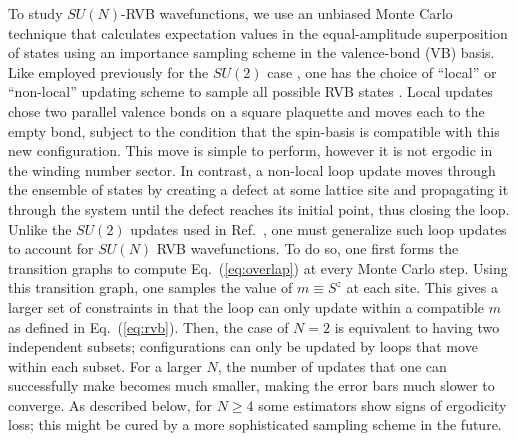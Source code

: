 \documentclass[11pt]{iopart}
\begin{document}
To study $SU(N)$-RVB wavefunctions, we use an unbiased Monte Carlo technique that calculates expectation values in the equal-amplitude superposition of states using an importance sampling scheme in the valence-bond (VB) basis.  Like employed previously for the $SU(2)$ case \cite{Ju2012}, one has the choice of ``local'' or ``non-local''
updating scheme to sample all possible RVB states \cite{sandvik2010loop}.
Local updates chose two parallel valence bonds on a square plaquette and moves each to the empty bond, subject to the condition that the spin-basis is compatible with this new configuration.  This move is simple to perform, however it is not ergodic in the winding number sector.
In contrast, a non-local loop update moves through the ensemble of states by creating a defect at some lattice site and propagating it through the system until the defect reaches its initial point, thus closing the loop.  Unlike the $SU(2)$ updates used in Ref.~\cite{RVB2}, one must generalize such loop updates to account for $SU(N)$ RVB wavefunctions.  To do so, one first forms the transition graphs to compute Eq.~(\ref{eq:overlap}) at every Monte Carlo step. Using this transition graph, one samples the value of $m \equiv S^z$ at each site. This gives a larger set of constraints in that the loop can only update within a compatible $m$ as defined in Eq.~(\ref{eq:rvb}). Then, the case of $N=2$ is equivalent to having two independent subsets; configurations can only be updated by loops that move within each subset. For a larger $N$, the number of updates that one can successfully make becomes much smaller, making the error bars much slower to converge.
As described below, for $N \ge 4$ some estimators show signs of ergodicity loss; this might be cured by a more sophisticated sampling scheme in the future.
\end{document}

